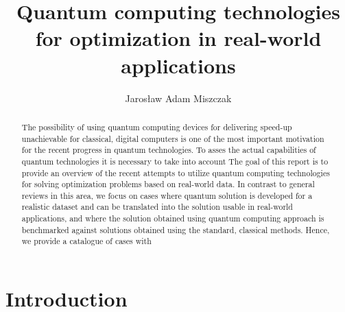 \documentclass[a4paper,11pt]{article}
\newcommand{\docName}{report\xspace}
\begin{document}

\title{Quantum computing technologies for optimization in real-world applications}
\author{Jaros\l aw Adam Miszczak}

\maketitle

\begin{abstract}
The possibility of using quantum computing devices for delivering speed-up unachievable for classical, digital computers is one of the most important motivation for the recent progress in quantum technologies. To asses the actual capabilities of quantum technologies it is necessary to take into account
The goal of this \docName is to provide an overview of the recent attempts to utilize quantum computing technologies for solving optimization problems based on real-world data. In contrast to general reviews in this area, we focus on cases where quantum solution is developed for a realistic dataset and can be translated into the solution usable in real-world applications, and where  the solution obtained using quantum computing approach is benchmarked against solutions obtained using the standard, classical methods. Hence, we provide a catalogue of cases with  

\end{abstract}

%

\section{Introduction}
\end{document}
